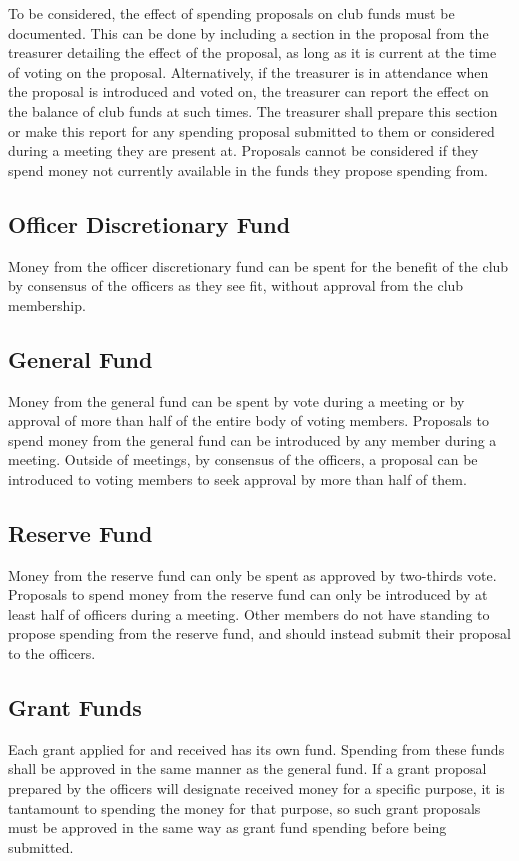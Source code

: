 \documentclass{article}
\begin{document}
To be considered, the effect of spending proposals on club funds must be
documented. This can be done by including a section in the proposal from the
treasurer detailing the effect of the proposal, as long as it is current at the
time of voting on the proposal. Alternatively, if the treasurer is in attendance
when the proposal is introduced and voted on, the treasurer can report the
effect on the balance of club funds at such times. The treasurer shall prepare
this section or make this report for any spending proposal submitted to them or
considered during a meeting they are present at. Proposals cannot be considered
if they spend money not currently available in the funds they propose spending
from.

\subsection{Officer Discretionary Fund}

Money from the officer discretionary fund can be spent for the benefit of the
club by consensus of the officers as they see fit, without approval from the
club membership.

\subsection{General Fund}

Money from the general fund can be spent by vote during a meeting or by approval
of more than half of the entire body of voting members. Proposals to spend money
from the general fund can be introduced by any member during a meeting. Outside
of meetings, by consensus of the officers, a proposal can be introduced to
voting members to seek approval by more than half of them.

\subsection{Reserve Fund}

Money from the reserve fund can only be spent as approved by two-thirds vote.
Proposals to spend money from the reserve fund can only be introduced by at
least half of officers during a meeting. Other members do not have standing to
propose spending from the reserve fund, and should instead submit their proposal
to the officers.

\subsection{Grant Funds}

Each grant applied for and received has its own fund. Spending from these funds
shall be approved in the same manner as the general fund. If a grant proposal
prepared by the officers will designate received money for a specific purpose,
it is tantamount to spending the money for that purpose, so such grant proposals
must be approved in the same way as grant fund spending before being submitted.
\end{document}
